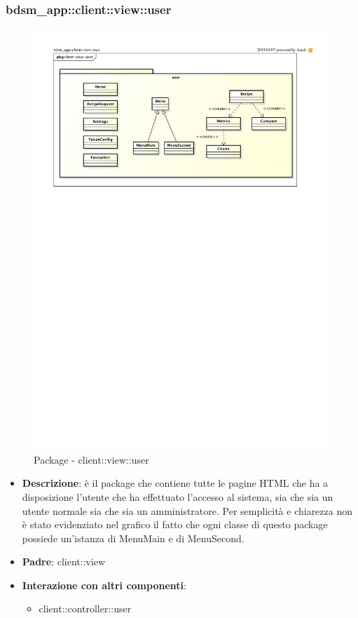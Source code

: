 \subsubsection{bdsm\_app::client::view::user} %
\label{ssub:bdsm_app_client_view_user}
\begin{figure}[htbp]
	\centering
	\centerline{\includegraphics[scale=0.8]{./images/client/client_view_user.pdf}}
	\caption{Package - client::view::user}
\end{figure}

\begin{itemize}
	\item \textbf{Descrizione}: è il package che contiene tutte le pagine HTML che ha a disposizione l'utente che ha effettuato l'accesso al sistema, sia che sia un utente normale sia che sia un amministratore. \newline
	Per semplicità e chiarezza non è stato evidenziato nel grafico il fatto che ogni classe di questo package possiede un'istanza di MenuMain e di MenuSecond.
	\item \textbf{Padre}: client::view
	\item \textbf{Interazione con altri componenti}:
		\begin{itemize}
			\item client::controller::user
		\end{itemize}
\end{itemize}

